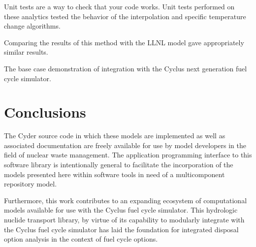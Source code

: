 \documentclass{anstrans}
\begin{document}

Unit tests are a way to check that your code works. Unit tests performed on 
these analytics tested the behavior of the interpolation and specific 
temperature change algorithms.


Comparing the results of this method with the \gls{LLNL} model gave 
appropriately similar results. 


The base case demonstration of integration with the Cyclus next generation 
fuel cycle simulator.

\section{Conclusions}
The Cyder source code in which these models are implemented as well as 
associated documentation are freely available for use by model developers in the 
field of nuclear waste management. The application programming interface to this 
software library is intentionally general to facilitate the incorporation of the 
models presented here within software tools in need of a multicomponent repository 
model.

Furthermore, this work contributes to an expanding ecosystem of computational 
models available for use with the Cyclus fuel cycle simulator. This hydrologic 
nuclide transport library, by virtue of its capability to modularly integrate 
with the Cyclus fuel cycle simulator has laid the foundation for integrated 
disposal option analysis in the context of fuel cycle options. 



\end{document}
